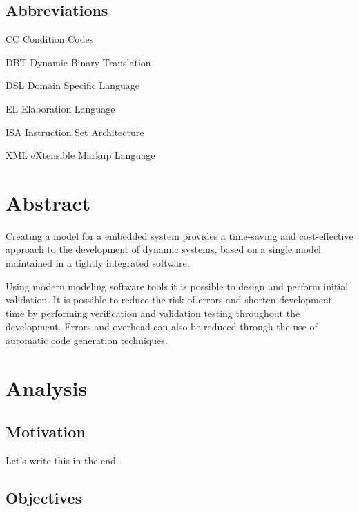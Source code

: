 \documentclass{report}
\newenvironment{abbreviations}{\begin{list}{}{\renewcommand{\makelabel}{\abbrlabel}}}{\end{list}}
\newcommand{\abbrlabel}[1]{\makebox[3cm][l]{\textbf{#1}\ \dotfill}}
\begin{document}
\section*{Abbreviations}
\begin{abbreviations} 
	\item[CC] Condition Codes
	\item[DBT] Dynamic Binary Translation
	\item[DSL] Domain Specific Language
	\item[EL] Elaboration Language
	\item[ISA] Instruction Set Architecture
	\item[XML] eXtensible Markup Language
\end{abbreviations}
\newpage
\chapter{Abstract}

\par Creating a model for a embedded system provides a time-saving and cost-effective approach to the development of dynamic systems, based on a single model maintained in a tightly integrated software. 
\par Using modern modeling software tools it is possible to design and perform initial validation. It is possible to reduce the risk of errors and shorten development time by performing verification and validation testing throughout the development. Errors and overhead can also be reduced through the use of automatic code generation techniques\cite{modelling-embsys}.
\chapter{Analysis}

	\section{Motivation}
	
	\par Let's write this in the end.

	\section{Objectives}
	
\end{document}
